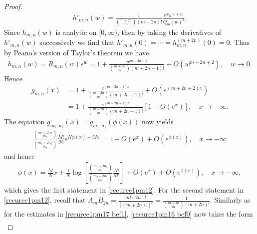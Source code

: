 \documentclass[10pt,a4paper]{amsart}
\begin{document}
\begin{proof}
\begin{equation*}%
\begin{split}
h'_{m,n}(w)=\frac{1}{\binom{m+2n}{m}(m+2n)!}\frac{e^ww^{m+2n}}{Q_m(w)^2}.
\end{split}
\end{equation*}
Since $h_{m,n}(w)$ is analytic on $[0,\infty)$, then by taking the derivatives of $h'_{m,n}(w)$ successively we find that $h'_{m,n}(0)=\cdots=h^{(m+2n)}_{m,n}(0)=0$. Thus by Peano's version of Taylor's theorem we have
\begin{equation*}%
\begin{split}
h_{m,n}(w)=R_{m,n}(w)e^{w}=1+\frac{w^{m+2n+1}}{\binom{m+2n}{m}(m+2n+1)!}+O(w^{m+2n+2}), \quad w\to 0.
\end{split}
\end{equation*}
Hence
\begin{equation*}%
\begin{split}
g_{m,n}(x)&=1+\frac{e^{(m+2n+1)x}}{\binom{m+2n}{m}(m+2n+1)!}+O(e^{(m+2n+2)x})\\
&=1+\frac{e^{(m+2n+1)x}}{\binom{m+2n}{m}(m+2n+1)!}\left[1+O(e^{x})\right], \quad x\to-\infty.
\end{split}
\end{equation*}
The equation $g_{m_2,n_2}(x)=g_{m_1,n_1}(\phi(x))$ now yields
\begin{equation*}%
\begin{split}
\frac{\binom{m_2+2n_2}{m_2}}{\binom{m_1+2n_1}{m_1}}\frac{M!}{N!}e^{N\phi(x)-Mx}=1+O(e^{x})+O(e^{\phi(x)}), \quad x\to-\infty
\end{split}
\end{equation*}
and hence
\begin{equation*}%
\begin{split}
\phi(x)=\frac{M}{N}x+\frac{1}{N}\log \left[\frac{\binom{m_1+2n_1}{m_1}}{\binom{m_2+2n_2}{m_2}}\frac{N!}{M!}\right]+O(e^{x})+O(e^{\phi(x)}), \quad x\to-\infty,
\end{split}
\end{equation*}
which gives the first statement in \eqref{recuree1pm12}. For the second statement in \eqref{recuree1pm12}, recall that $A_{m}B_{2n}=\frac{m!(2n)!}{[(m+2n)!]^2}=\frac{1}{\binom{m+2n}{m}(m+2n)!}$. Similarly as for the estimates in \eqref{recuree1pm17 bef1}, \eqref{recuree1pm16  bef0} now takes the form
\begin{equation*}%
\begin{split}

\end{split}
\end{equation*}
\end{proof}
\end{document}
